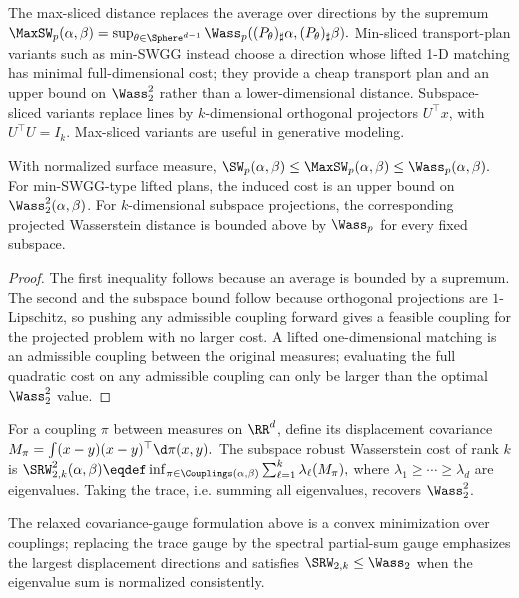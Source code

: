 \begin{defn}\label{def-sliced-variants}
The max-sliced distance replaces the average over directions by the supremum
\(\MaxSW_p(\alpha,\beta)= \sup_{\theta\in\Sphere^{d-1}} \Wass_p((P_\theta)_\sharp\alpha,(P_\theta)_\sharp\beta).\)
Min-sliced transport-plan variants such as min-SWGG instead choose a direction whose lifted 1-D matching has minimal full-dimensional cost; they provide a cheap transport plan and an upper bound on $\Wass_2^2$ rather than a lower-dimensional distance. Subspace-sliced variants replace lines by $k$-dimensional orthogonal projectors $U^\top x$, with $U^\top U=I_k$. Max-sliced variants are useful in generative modeling.
\end{defn}
\begin{prop}\label{prop-sliced-variant-bounds}
With normalized surface measure, \(\SW_p(\alpha,\beta) \leq \MaxSW_p(\alpha,\beta) \leq \Wass_p(\alpha,\beta).\)
For min-SWGG-type lifted plans, the induced cost is an upper bound on $\Wass_2^2(\alpha,\beta)$. For $k$-dimensional subspace projections, the corresponding projected Wasserstein distance is bounded above by $\Wass_p$ for every fixed subspace.
\end{prop}
\begin{proof}
The first inequality follows because an average is bounded by a supremum. The second and the subspace bound follow because orthogonal projections are $1$-Lipschitz, so pushing any admissible coupling forward gives a feasible coupling for the projected problem with no larger cost. A lifted one-dimensional matching is an admissible coupling between the original measures; evaluating the full quadratic cost on any admissible coupling can only be larger than the optimal $\Wass_2^2$ value.
\end{proof}
\begin{defn}\label{def-subspace-robust-wasserstein}
For a coupling $\pi$ between measures on $\RR^d$, define its displacement covariance
\(M_\pi=\int (x-y)(x-y)^\top\d\pi(x,y).\)
The subspace robust Wasserstein cost of rank $k$ is \(\SRW_{2,k}^2(\alpha,\beta) \eqdef \inf_{\pi\in\Couplings(\alpha,\beta)} \sum_{\ell=1}^k \lambda_\ell(M_\pi),\)
where $\lambda_1\geq\cdots\geq\lambda_d$ are eigenvalues. Taking the trace, i.e. summing all eigenvalues, recovers $\Wass_2^2$.
\end{defn}
\begin{prop}\label{prop-subspace-robust-metric}
The relaxed covariance-gauge formulation above is a convex minimization over couplings; replacing the trace gauge by the spectral partial-sum gauge emphasizes the largest displacement directions and satisfies $\SRW_{2,k}\leq\Wass_2$ when the eigenvalue sum is normalized consistently.
\end{prop}
